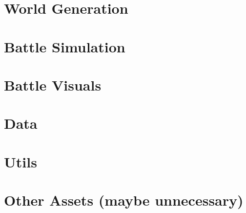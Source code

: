 \section{World Generation}\label{sec:docs-worldgen}

\section{Battle Simulation}\label{sec:docs-sim}

\section{Battle Visuals}\label{sec:docs-vis}

\section{Data}\label{sec:docs-data}

\section{Utils}\label{sec:docs-utils}

\section{Other Assets (maybe unnecessary)}
